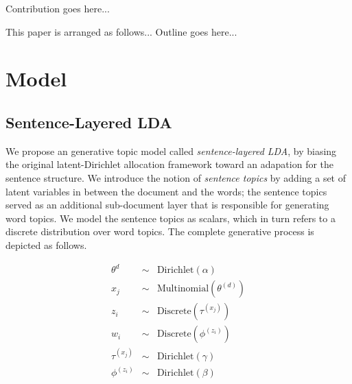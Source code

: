 {\color{red} Contribution goes here...}

This paper is arranged as follows... {\color{red} Outline goes here...}

\section{Model}
\subsection{Sentence-Layered LDA}

We propose an generative topic model called {\it sentence-layered LDA}, by
biasing the original latent-Dirichlet allocation framework toward an adapation
{for} the sentence structure.  We introduce the notion of {\it sentence
topics} by adding a set of latent variables in between the document and the
words; the sentence topics served as an additional sub-document layer that is
responsible for generating word topics.  We model the sentence topics as
scalars, which in turn refers to a discrete distribution over word topics.  The
complete generative process is depicted as follows.

\begin{eqnarray*}
  \theta^{d} &\sim& \mathrm{Dirichlet}(\alpha) \\
  x_j &\sim& \mathrm{Multinomial}(\theta^{(d)}) \\
  z_i &\sim& \mathrm{Discrete}(\tau^{(x_j)}) \\
  w_i &\sim& \mathrm{Discrete}(\phi^{(z_i)}) \\
  \tau^{(x_j)} &\sim& \mathrm{Dirichlet}(\gamma) \\
  \phi^{(z_i)} &\sim& \mathrm{Dirichlet}(\beta) 
\end{eqnarray*}

